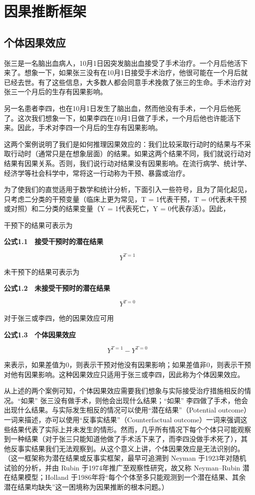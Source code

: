 \documentclass[
  chinese-hans,
  letterpaper,
  DIV=11,
  numbers=noendperiod]{scrreprt}
\begin{document}
\chapter{因果推断框架}\label{ux56e0ux679cux63a8ux65adux6846ux67b6}

\section{个体因果效应}\label{ux4e2aux4f53ux56e0ux679cux6548ux5e94}

张三是一名脑出血病人，10月1日因突发脑出血接受了手术治疗。一个月后他活下来了。想象一下，如果张三没有在10月1日接受手术治疗，他很可能在一个月后就已经去世。有了这些信息，大多数人都会同意手术挽救了张三的生命。手术治疗对张三一个月后的生存有因果影响。

另一名患者李四，也在10月1日发生了脑出血，然而他没有手术，一个月后他死了。这次我们想象一下，如果李四在10月1日做了手术，一个月后他也许能活下来。因此，手术对李四一个月后的生存有因果影响。

这两个案例说明了我们是如何推理因果效应的：我们比较采取行动时的结果与不采取行动时（通常只是在想象层面）的结果。如果这两个结果不同，我们就说行动对结果有因果关系。否则，我们说行动对结果没有因果影响。在流行病学、统计学、经济学等社会科学中，常将这一行动称为干预、暴露或治疗。

为了使我们的直觉适用于数学和统计分析，下面引入一些符号，且为了简化起见，只考虑二分类的干预变量（临床上更为常见，T
= 1代表干预，T = 0代表未干预或对照）和二分类的结果变量（Y = 1代表死亡，Y
= 0代表存活）。因此，

干预下的结果可表示为

\textbf{公式1.1　接受干预时的潜在结果}

\[Y^{T = 1}\]

未干预下的结果可表示为

\textbf{公式1.2　未接受干预时的潜在结果}

\[Y^{T = 0}\]

对于张三或李四，他的因果效应可用

\textbf{公式1.3　个体因果效应}

\[Y^{T = 1} - Y^{T = 0}\]

来表示，如果差值为0，则表示干预对他没有因果影响；如果差值非0，则表示干预对他有因果影响。这种因果效应只适用于张三或李四，因此称为个体因果效应。

从上述的两个案例可知，个体因果效应需要我们想象与实际接受治疗措施相反的情况。``如果''
张三没有做手术，则他会出现什么结果；``如果''
李四做了手术，他会出现什么结果。与实际发生相反的情况可以使用``潜在结果''（Potential
outcome）一词来描述，亦可以使用``反事实结果''（Counterfactual
outcome）一词来强调这些结果代表了实际上并未发生的情形。然而，几乎所有情况下每个个体只可能观察到一种结果（对于张三只能知道他做了手术活下来了，而李四没做手术死了），其他反事实结果我们无法观察到。从这个意义上讲，个体因果效应是无法识别的。（这一框架称为潜在结果或反事实框架，最早可追溯到
Neyman 于1923年对随机试验的分析，并由 Rubin
于1974年推广至观察性研究，故又称 Neyman--Rubin 潜在结果模型；Holland
于1986年将``每个个体至多只能观测到一个潜在结果、其余潜在结果均缺失''这一困境称为因果推断的根本问题。）
\end{document}
